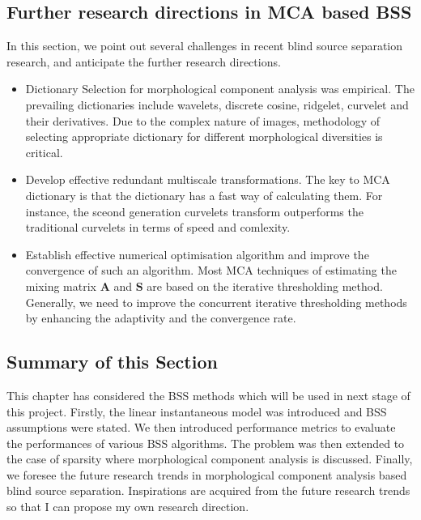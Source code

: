 \subsection{Further research directions in MCA based BSS}
In this section, we point out several challenges in recent blind source separation research, and anticipate the further research directions.\\
\begin{itemize}
    \item Dictionary Selection for morphological component analysis was empirical. The prevailing dictionaries include wavelets, discrete cosine, ridgelet, curvelet and their derivatives. Due to the complex nature of images, methodology of selecting appropriate dictionary for different  morphological diversities is critical.
    \item Develop effective redundant multiscale transformations. The key to MCA dictionary is that the dictionary has a fast way of calculating them. For instance, the sceond generation curvelets transform outperforms the traditional curvelets in terms of speed and comlexity.
    \item Establish effective numerical optimisation algorithm and improve the convergence of such an algorithm. Most MCA techniques of estimating the mixing matrix $\mathbf{A}$ and $\mathbf{S}$ are based on the iterative thresholding method. Generally, we need to improve the concurrent iterative thresholding methods by enhancing the adaptivity and the convergence rate.
\end{itemize}


\subsection{Summary of this Section}
This chapter has considered the BSS methods which will be used in next stage of this project. Firstly, the linear instantaneous model was introduced and BSS assumptions were stated. We then introduced performance metrics to evaluate the performances of various BSS algorithms. The problem was then extended to the case of sparsity where morphological component analysis is discussed. Finally, we foresee the future research trends in morphological component analysis based blind source separation. Inspirations are acquired from the future research trends so that I can propose my own research direction.
